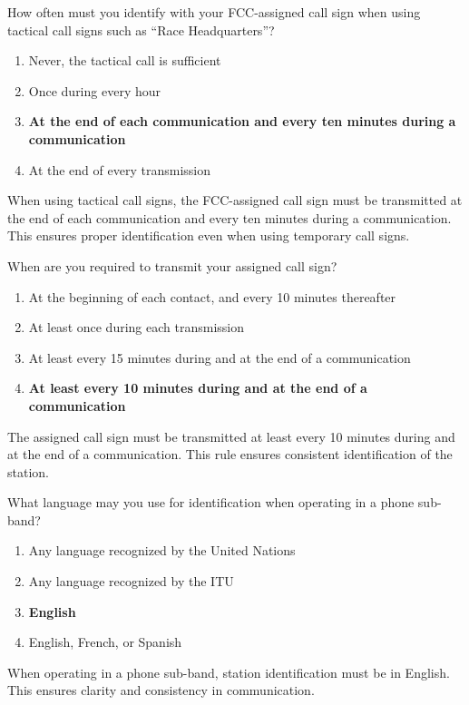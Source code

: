 
\begin{tcolorbox}[colback=gray!10!white,colframe=black!75!black,title={T1F02}]
    How often must you identify with your FCC-assigned call sign when using tactical call signs such as “Race Headquarters”?
    \begin{enumerate}[label=\Alph*,noitemsep]
        \item Never, the tactical call is sufficient
        \item Once during every hour
        \item \textbf{At the end of each communication and every ten minutes during a communication}
        \item At the end of every transmission
    \end{enumerate}
\end{tcolorbox}
When using tactical call signs, the FCC-assigned call sign must be transmitted at the end of each communication and every ten minutes during a communication. This ensures proper identification even when using temporary call signs.


\begin{tcolorbox}[colback=gray!10!white,colframe=black!75!black,title={T1F03}]
    When are you required to transmit your assigned call sign?
    \begin{enumerate}[label=\Alph*,noitemsep]
        \item At the beginning of each contact, and every 10 minutes thereafter
        \item At least once during each transmission
        \item At least every 15 minutes during and at the end of a communication
        \item \textbf{At least every 10 minutes during and at the end of a communication}
    \end{enumerate}
\end{tcolorbox}
The assigned call sign must be transmitted at least every 10 minutes during and at the end of a communication. This rule ensures consistent identification of the station.


\begin{tcolorbox}[colback=gray!10!white,colframe=black!75!black,title={T1F04}]
    What language may you use for identification when operating in a phone sub-band?
    \begin{enumerate}[label=\Alph*,noitemsep]
        \item Any language recognized by the United Nations
        \item Any language recognized by the ITU
        \item \textbf{English}
        \item English, French, or Spanish
    \end{enumerate}
\end{tcolorbox}
When operating in a phone sub-band, station identification must be in English. This ensures clarity and consistency in communication.

